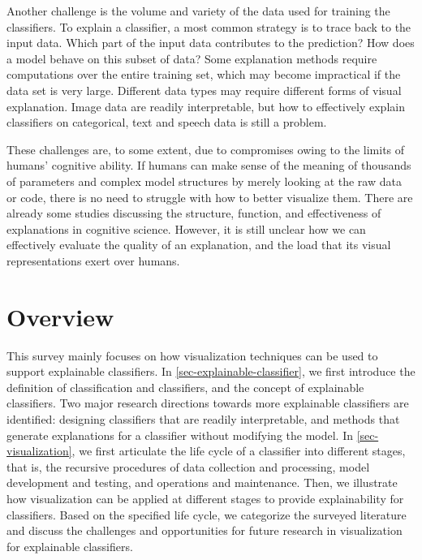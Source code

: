 Another challenge is the volume and variety of the data used for training the classifiers. To explain a classifier, a most common strategy is to trace back to the input data. Which part of the input data contributes to the prediction? How does a model behave on this subset of data? Some explanation methods require computations over the entire training set, which may become impractical if the data set is very large. Different data types may require different forms of visual explanation. Image data are readily interpretable, but how to effectively explain classifiers on categorical, text and speech data is still a problem.

These challenges are, to some extent, due to compromises owing to the limits of humans' cognitive ability. If humans can make sense of the meaning of thousands of parameters and complex model structures by merely looking at the raw data or code, there is no need to struggle with how to better visualize them. There are already some studies discussing the structure, function, and effectiveness of explanations in cognitive science. However, it is still unclear how we can effectively evaluate the quality of an explanation, and the load that its visual representations exert over humans.


\section{Overview}

This survey mainly focuses on how visualization techniques can be used to support explainable classifiers. In \autoref{sec-explainable-classifier}, we first introduce the definition of classification and classifiers, and the concept of explainable classifiers. Two major research directions towards more explainable classifiers are identified: designing classifiers that are readily interpretable, and methods that generate explanations for a classifier without modifying the model. In \autoref{sec-visualization}, we first articulate the life cycle of a classifier into different stages, that is, the recursive procedures of data collection and processing, model development and testing, and operations and maintenance. Then, we illustrate how visualization can be applied at different stages to provide explainability for classifiers. Based on the specified life cycle, we categorize the surveyed literature and discuss the challenges and opportunities for future research in visualization for explainable classifiers.

\newpage
